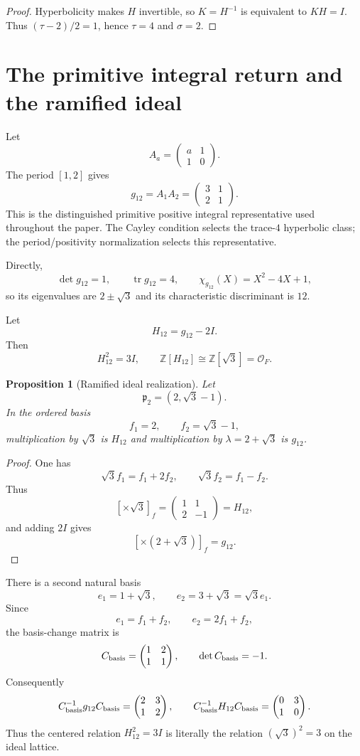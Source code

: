 \documentclass[11pt]{article}
\newtheorem{proposition}[theorem]{Proposition}
\theoremstyle{definition}
\theoremstyle{remark}
\newcommand{\Z}{\mathbb Z}
\newcommand{\OO}{\mathcal O}
\newcommand{\tr}{\operatorname{tr}}
\begin{document}
\begin{proof}
Hyperbolicity makes $H$ invertible, so
$K=H^{-1}$ is equivalent to $KH=I$.  Thus
$(\tau-2)/2=1$, hence $\tau=4$ and $\sigma=2$.
\end{proof}

\section{The primitive integral return and the ramified ideal}

Let
\[
A_a=\begin{pmatrix}a&1\\1&0\end{pmatrix}.
\]
The period $[1,2]$ gives
\[
g_{12}=A_1A_2
=\begin{pmatrix}3&1\\2&1\end{pmatrix}.
\]
This is the distinguished primitive positive integral representative used
throughout the paper.  The Cayley condition selects the trace-$4$ hyperbolic
class; the period/positivity normalization selects this representative.

Directly,
\[
\det g_{12}=1,
\qquad
\tr g_{12}=4,
\qquad
\chi_{g_{12}}(X)=X^2-4X+1,
\]
so its eigenvalues are $2\pm\sqrt3$ and its characteristic discriminant is
$12$.

Let
\[
H_{12}=g_{12}-2I.
\]
Then
\[
H_{12}^2=3I,
\qquad
\Z[H_{12}]\cong\Z[\sqrt3]=\OO_F.
\]

\begin{proposition}[Ramified ideal realization]
Let
\[
\mathfrak p_2=(2,\sqrt3-1).
\]
In the ordered basis
\[
f_1=2,
\qquad
f_2=\sqrt3-1,
\]
multiplication by $\sqrt3$ is $H_{12}$ and multiplication by
$\lambda=2+\sqrt3$ is $g_{12}$.
\end{proposition}

\begin{proof}
One has
\[
\sqrt3 f_1=f_1+2f_2,
\qquad
\sqrt3 f_2=f_1-f_2.
\]
Thus
\[
[\times\sqrt3]_f
=\begin{pmatrix}1&1\\2&-1\end{pmatrix}=H_{12},
\]
and adding $2I$ gives
\[
[\times(2+\sqrt3)]_f=g_{12}.
\]
\end{proof}

There is a second natural basis
\[
e_1=1+\sqrt3,
\qquad
e_2=3+\sqrt3=\sqrt3 e_1.
\]
Since
\[
e_1=f_1+f_2,
\qquad
e_2=2f_1+f_2,
\]
the basis-change matrix is
\[
C_{\rm basis}=\begin{pmatrix}1&2\\1&1\end{pmatrix},
\qquad \det C_{\rm basis}=-1.
\]
Consequently
\[
C_{\rm basis}^{-1}g_{12}C_{\rm basis}
=\begin{pmatrix}2&3\\1&2\end{pmatrix},
\qquad
C_{\rm basis}^{-1}H_{12}C_{\rm basis}
=\begin{pmatrix}0&3\\1&0\end{pmatrix}.
\]
Thus the centered relation $H_{12}^2=3I$ is literally the relation
$(\sqrt3)^2=3$ on the ideal lattice.
\end{document}
